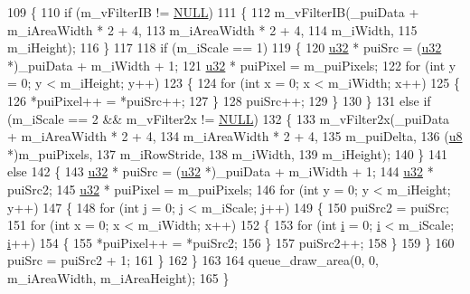 \begin{DoxyCode}
109 \{
110   \textcolor{keywordflow}{if} (m\_vFilterIB != \mbox{\hyperlink{getopt1_8c_a070d2ce7b6bb7e5c05602aa8c308d0c4}{NULL}})
111   \{
112     m\_vFilterIB(\_puiData + m\_iAreaWidth * 2 + 4,
113                 m\_iAreaWidth * 2 + 4,
114                 m\_iWidth,
115                 m\_iHeight);
116   \}
117 
118   \textcolor{keywordflow}{if} (m\_iScale == 1)
119   \{
120     \mbox{\hyperlink{_system_8h_a10e94b422ef0c20dcdec20d31a1f5049}{u32}} * puiSrc = (\mbox{\hyperlink{_system_8h_a10e94b422ef0c20dcdec20d31a1f5049}{u32}} *)\_puiData + m\_iWidth + 1;
121     \mbox{\hyperlink{_system_8h_a10e94b422ef0c20dcdec20d31a1f5049}{u32}} * puiPixel = m\_puiPixels;
122     \textcolor{keywordflow}{for} (\textcolor{keywordtype}{int} y = 0; y < m\_iHeight; y++)
123     \{
124       \textcolor{keywordflow}{for} (\textcolor{keywordtype}{int} x = 0; x < m\_iWidth; x++)
125       \{
126         *puiPixel++ = *puiSrc++;
127       \}
128       puiSrc++;
129     \}
130   \}
131   \textcolor{keywordflow}{else} \textcolor{keywordflow}{if} (m\_iScale == 2 && m\_vFilter2x != \mbox{\hyperlink{getopt1_8c_a070d2ce7b6bb7e5c05602aa8c308d0c4}{NULL}})
132   \{
133     m\_vFilter2x(\_puiData + m\_iAreaWidth * 2 + 4,
134                 m\_iAreaWidth * 2 + 4,
135                 m\_puiDelta,
136                 (\mbox{\hyperlink{_system_8h_aed742c436da53c1080638ce6ef7d13de}{u8}} *)m\_puiPixels,
137                 m\_iRowStride,
138                 m\_iWidth,
139                 m\_iHeight);
140   \}
141   \textcolor{keywordflow}{else}
142   \{
143     \mbox{\hyperlink{_system_8h_a10e94b422ef0c20dcdec20d31a1f5049}{u32}} * puiSrc = (\mbox{\hyperlink{_system_8h_a10e94b422ef0c20dcdec20d31a1f5049}{u32}} *)\_puiData + m\_iWidth + 1;
144     \mbox{\hyperlink{_system_8h_a10e94b422ef0c20dcdec20d31a1f5049}{u32}} * puiSrc2;
145     \mbox{\hyperlink{_system_8h_a10e94b422ef0c20dcdec20d31a1f5049}{u32}} * puiPixel = m\_puiPixels;
146     \textcolor{keywordflow}{for} (\textcolor{keywordtype}{int} y = 0; y < m\_iHeight; y++)
147     \{
148       \textcolor{keywordflow}{for} (\textcolor{keywordtype}{int} j = 0; j < m\_iScale; j++)
149       \{
150         puiSrc2 = puiSrc;
151         \textcolor{keywordflow}{for} (\textcolor{keywordtype}{int} x = 0; x < m\_iWidth; x++)
152         \{
153           \textcolor{keywordflow}{for} (\textcolor{keywordtype}{int} \mbox{\hyperlink{expr-lex_8cpp_acb559820d9ca11295b4500f179ef6392}{i}} = 0; \mbox{\hyperlink{expr-lex_8cpp_acb559820d9ca11295b4500f179ef6392}{i}} < m\_iScale; \mbox{\hyperlink{expr-lex_8cpp_acb559820d9ca11295b4500f179ef6392}{i}}++)
154           \{
155             *puiPixel++ = *puiSrc2;
156           \}
157           puiSrc2++;
158         \}
159       \}
160       puiSrc = puiSrc2 + 1;
161     \}
162   \}
163 
164   queue\_draw\_area(0, 0, m\_iAreaWidth, m\_iAreaHeight);
165 \}
\end{DoxyCode}
